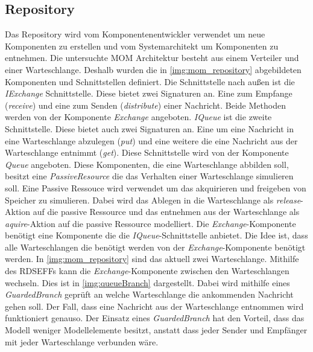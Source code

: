 \subsection{Repository}
Das Repository wird vom Komponentenentwickler verwendet um neue Komponenten zu erstellen und vom Systemarchitekt um Komponenten zu entnehmen. Die untersuchte MOM Architektur besteht aus einem Verteiler und einer Warteschlange. Deshalb wurden die in \autoref{img:mom_repository} abgebildeten Komponenten und Schnittstellen definiert. Die Schnittstelle nach außen ist die \emph{IExchange} Schnittstelle. Diese bietet zwei Signaturen an. Eine zum Empfange (\emph{receive}) und eine zum Senden (\emph{distribute}) einer Nachricht. Beide Methoden werden von der Komponente \emph{Exchange} angeboten. \emph{IQueue} ist die zweite Schnittstelle. Diese bietet auch zwei Signaturen an. Eine um eine Nachricht in eine Warteschlange abzulegen (\emph{put}) und eine weitere die eine Nachricht aus der Warteschlange entnimmt (\emph{get}). Diese Schnittstelle wird von der Komponente \emph{Queue} angeboten. Diese Komponenten, die eine Warteschlange abbilden soll, besitzt eine \emph{PassiveResource} die das Verhalten einer Warteschlange simulieren soll. Eine Passive Ressouce wird verwendet um das akquirieren und freigeben von Speicher zu simulieren. Dabei wird das Ablegen in die Warteschlange als \emph{release}-Aktion auf die passive Ressource und das entnehmen aus der Warteschlange als \emph{aquire}-Aktion auf die passive Ressource modelliert. Die \emph{Exchange}-Komponente benötigt eine Komponente die die \emph{IQueue}-Schnittstelle anbietet. Die Idee ist, dass alle Warteschlangen die benötigt werden von der \emph{Exchange}-Komponente benötigt werden. In \autoref{img:mom_repository} sind das aktuell zwei Warteschlange. Mithilfe des RDSEFFs kann die \emph{Exchange}-Komponente zwischen den Warteschlangen wechseln. Dies ist in \autoref{img:queueBranch} dargestellt. Dabei wird mithilfe eines \emph{GuardedBranch} geprüft an welche Warteschlange die ankommenden Nachricht gehen soll. Der Fall, dass eine Nachricht aus der Warteschlange entnommen wird funktioniert genauso. Der Einsatz eines \emph{GuardedBranch} hat den Vorteil, dass das Modell weniger Modellelemente besitzt, anstatt dass jeder Sender und Empfänger mit jeder Warteschlange verbunden wäre.




